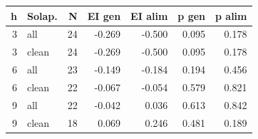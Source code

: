 \begin{tabular}{rlrrrrr}
\toprule
h & Solap. & N & EI gen & EI alim & p gen & p alim\\
\midrule
3 & all & 24 & -0.269 & -0.500 & 0.095 & 0.178\\
3 & clean & 24 & -0.269 & -0.500 & 0.095 & 0.178\\
6 & all & 23 & -0.149 & -0.184 & 0.194 & 0.456\\
6 & clean & 22 & -0.067 & -0.054 & 0.579 & 0.821\\
9 & all & 22 & -0.042 & 0.036 & 0.613 & 0.842\\
9 & clean & 18 & 0.069 & 0.246 & 0.481 & 0.189\\
\bottomrule
\end{tabular}
